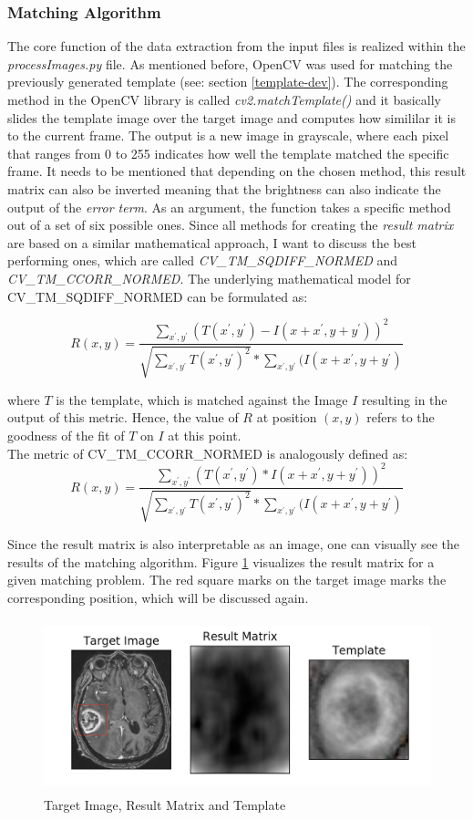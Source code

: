 \documentclass[twoside,11pt]{article}
\begin{document}
\subsubsection{Matching Algorithm}
The core function of the data extraction from the input files is realized within the \textit{processImages.py} file. As mentioned before, OpenCV was used for matching the previously generated template (see: section \ref{template-dev}). The corresponding method in the OpenCV library is called \textit{cv2.matchTemplate()} and it basically slides the template image over the target image and computes how simililar it is to the current frame. The output is a new image in grayscale, where each pixel that ranges from 0 to 255 indicates how well the template matched the specific frame. It needs to be mentioned that depending on the chosen method, this result matrix can also be inverted meaning that the brightness can also indicate the output of the \textit{error term}.
As an argument, the function takes a specific method out of a set of six possible ones. Since all methods for creating the \textit{result matrix} are based on a similar mathematical approach, I want to discuss the best performing ones, which are called \textit{CV\_TM\_SQDIFF\_NORMED} and \textit{CV\_TM\_CCORR\_NORMED}. The underlying mathematical model for CV\_TM\_SQDIFF\_NORMED can be formulated as:

$$
R(x,y) = \frac{\sum_{x^{'},y^{'}}^{}(T(x^{'},y^{'})-I(x+x^{'},y+y^{'}))^2}{\sqrt{\sum_{x^{'},y^{'}}^{}T(x^{'},y^{'})^2}*\sum_{x^{'},y^{'}}^{}(I(x+x^{'},y+y^{'})}
$$

where $T$ is the template, which is matched against the Image $I$ resulting in the output of this metric. Hence, the value of $R$ at position $(x,y)$ refers to the goodness of the fit of $T$ on $I$ at this point. \\
The metric of CV\_TM\_CCORR\_NORMED is analogously defined as: 
$$
R(x,y) = \frac{\sum_{x^{'},y^{'}}^{}(T(x^{'},y^{'})*I(x+x^{'},y+y^{'}))^2}{\sqrt{\sum_{x^{'},y^{'}}^{}T(x^{'},y^{'})^2}*\sum_{x^{'},y^{'}}^{}(I(x+x^{'},y+y^{'})}
$$
\citep{opencvmethods}

Since the result matrix is also interpretable as an image, one can visually see the results of the matching algorithm. Figure \ref{fig:result-matrix} visualizes the result matrix for a given matching problem. The red square marks on the target image marks the corresponding position, which will be discussed again.

\begin{figure}
	\label{fig:result-matrix}
	\centering
	\includegraphics[height=5cm]{result-matrix}
	\caption{Target Image, Result Matrix and Template}
\end{figure}%
\end{document}
